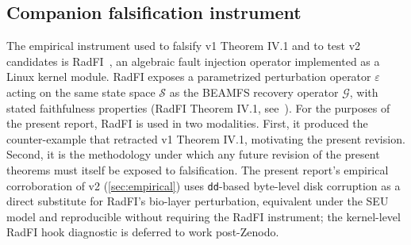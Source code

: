 \subsection{Companion falsification instrument}

The empirical instrument used to falsify v1 Theorem IV.1 and to
test v2 candidates is RadFI~\cite{desbrieres2026radfi}, an
algebraic fault injection operator implemented as a Linux kernel
module. RadFI exposes a parametrized perturbation operator
\(\varepsilon\) acting on the same state space \(\mathcal{S}\) as
the BEAMFS recovery operator \(\mathcal{G}\), with stated
faithfulness properties (RadFI Theorem IV.1, see~\cite{desbrieres2026radfi}).
For the purposes of the present report, RadFI is used in two
modalities. First, it produced the counter-example that retracted
v1 Theorem IV.1, motivating the present revision. Second, it is
the methodology under which any future revision of the present
theorems must itself be exposed to falsification. The present
report's empirical corroboration of v2 (\cref{sec:empirical}) uses
\texttt{dd}-based byte-level disk corruption as a direct
substitute for RadFI's bio-layer perturbation, equivalent under
the SEU model and reproducible without requiring the RadFI
instrument; the kernel-level RadFI hook diagnostic is deferred to
work post-Zenodo.
